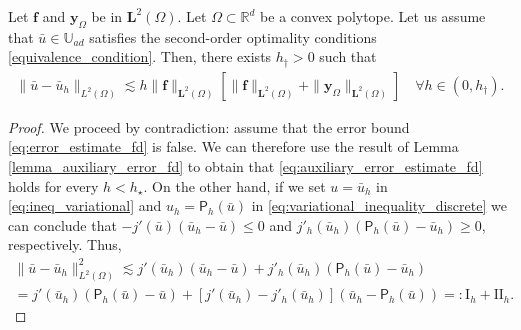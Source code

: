 \documentclass[final]{siamart0216}
\begin{document}
\begin{theorem}
\label{theorem_estimates_control}
Let $\boldsymbol{\mathbf{f}}$ and $\mathbf{y}_{\Omega}$ be in $\mathbf{L}^2(\Omega)$. Let $\Omega \subset \mathbb{R}^d$ be a convex polytope. Let us assume that $\bar{u}\in \mathbb{U}_{ad}$ satisfies the second-order optimality conditions \eqref{equivalence_condition}. Then, there exists $h_{\dagger}>0$ such that
\begin{align}\label{eq:error_estimate_fd}
\|\bar{u}-\bar{u}_{h}\|_{L^2(\Omega)}
\lesssim 
h\|\mathbf{f}\|_{\mathbf{L}^2(\Omega)}
\left[ 
\|\mathbf{f}\|_{\mathbf{L}^2(\Omega)}+\|\mathbf{y}_{\Omega}\|_{\mathbf{L}^2(\Omega)}
\right]
\quad\forall h\in(0, h_{\dagger}).
\end{align}
\end{theorem}
\begin{proof}
We proceed by contradiction: assume that the error bound \eqref{eq:error_estimate_fd} is false. We can therefore use the result of Lemma \ref{lemma_auxiliary_error_fd} to obtain that \eqref{eq:auxiliary_error_estimate_fd} holds for every $h<h_{\star}$. On the other hand, if we set $u=\bar{u}_h$ in \eqref{eq:ineq_variational} and $u_h=\mathsf{P}_h(\bar{u})$ in \eqref{eq:variational_inequality_discrete} we can conclude that $-j'(\bar{u})(\bar{u}_h-\bar{u})\leq 0$ and $j'_h(\bar{u}_h)(\mathsf{P}_h(\bar{u})-\bar{u}_h)\geq 0$, respectively. Thus,
\begin{multline}\label{eq:estimates_aux_error_fullydiscrete}
\|\bar{u}-\bar{u}_h\|_{L^2(\Omega)}^2\lesssim j'(\bar{u}_h)(\bar{u}_h-\bar{u})+j'_h (\bar{u}_h)(\mathsf{P}_h(\bar{u})-\bar{u}_h)\\
=j'(\bar{u}_h)(\mathsf{P}_h(\bar{u})-\bar{u})+\left[j'(\bar{u}_h)-j'_h (\bar{u}_h)\right](\bar{u}_h-\mathsf{P}_h(\bar{u}))=:\text{I}_h + \text{II}_h.
\end{multline}


\end{proof}
\end{document}
